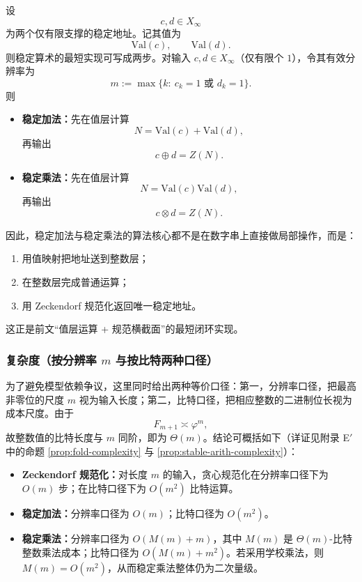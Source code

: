 设
\[
c,d\in X_\infty
\]
为两个仅有限支撑的稳定地址。记其值为
\[
\mathrm{Val}(c),\qquad \mathrm{Val}(d).
\]
则稳定算术的最短实现可写成两步。对输入 \(c,d\in X_\infty\)（仅有限个 \(1\)），令其有效分辨率为
\[
m:=\max\{k:\ c_k=1\text{ 或 }d_k=1\}.
\]
则
\begin{itemize}
  \item \textbf{稳定加法：}先在值层计算
  \[
  N=\mathrm{Val}(c)+\mathrm{Val}(d),
  \]
  再输出
  \[
  c\oplus d=Z(N).
  \]
  \item \textbf{稳定乘法：}先在值层计算
  \[
  N=\mathrm{Val}(c)\mathrm{Val}(d),
  \]
  再输出
  \[
  c\otimes d=Z(N).
  \]
\end{itemize}
因此，稳定加法与稳定乘法的算法核心都不是在数字串上直接做局部操作，而是：
\begin{enumerate}
  \item 用值映射把地址送到整数层；
  \item 在整数层完成普通运算；
  \item 用 Zeckendorf 规范化返回唯一稳定地址。
\end{enumerate}
这正是前文“值层运算 + 规范横截面”的最短闭环实现。

\subsubsection{复杂度（按分辨率 \texorpdfstring{$m$}{m} 与按比特两种口径）}

为了避免模型依赖争议，这里同时给出两种等价口径：第一，分辨率口径，把最高非零位的尺度 \(m\) 视为输入长度；第二，比特口径，把相应整数的二进制位长视为成本尺度。由于
\[
F_{m+1}\asymp \varphi^m,
\]
故整数值的比特长度与 \(m\) 同阶，即为 \(\Theta(m)\)。结论可概括如下（详证见附录 E$'$ 中的命题 \ref{prop:fold-complexity} 与 \ref{prop:stable-arith-complexity}）：

\begin{itemize}
  \item \textbf{Zeckendorf 规范化：}对长度 \(m\) 的输入，贪心规范化在分辨率口径下为 \(O(m)\) 步；在比特口径下为 \(O(m^2)\) 比特运算。
  \item \textbf{稳定加法：}分辨率口径为 \(O(m)\)；比特口径为 \(O(m^2)\)。
  \item \textbf{稳定乘法：}分辨率口径为 \(O(M(m)+m)\)，其中 \(M(m)\) 是 \(\Theta(m)\)-比特整数乘法成本；比特口径为 \(O(M(m)+m^2)\)。若采用学校乘法，则 \(M(m)=O(m^2)\)，从而稳定乘法整体仍为二次量级。
\end{itemize}



